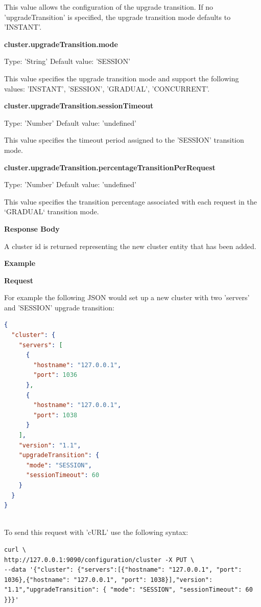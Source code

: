 \documentclass[a4paper,11pt,twoside]{report}
\begin{document}
\noindent
This value allows the configuration of the upgrade transition. If no 'upgradeTransition' is specified, the upgrade transition mode defaults to 'INSTANT'.\bigskip

\noindent
\textbf{cluster.upgradeTransition.mode}

\noindent
Type: 'String' Default value: 'SESSION'\smallskip

\noindent
This value specifies the upgrade transition mode and support the following values: 'INSTANT', 'SESSION', 'GRADUAL', 'CONCURRENT'.\bigskip

\noindent
\textbf{cluster.upgradeTransition.sessionTimeout}

\noindent
Type: 'Number' Default value: 'undefined'\smallskip

\noindent
This value specifies the timeout period assigned to the 'SESSION' transition mode. \bigskip

\noindent
\textbf{cluster.upgradeTransition.percentageTransitionPerRequest}

\noindent
Type: 'Number' Default value: 'undefined'\smallskip

\noindent
This value specifies the transition percentage associated with each request in the `GRADUAL` transition mode. \bigskip

\noindent
\textbf{Response Body}

\noindent
A cluster id is returned representing the new cluster entity that has been added. \bigskip

\noindent
\textbf{Example}\bigskip

\noindent
\textbf{Request}

\noindent
For example the following JSON would set up a new cluster with two 'servers' and 'SESSION' upgrade transition:\bigskip

\begin{lstlisting}[language=json]
{
  "cluster": {
    "servers": [
      {
        "hostname": "127.0.0.1", 
        "port": 1036
      },  
      {
        "hostname": "127.0.0.1", 
        "port": 1038
      }
    ], 
    "version": "1.1", 
    "upgradeTransition": {
      "mode": "SESSION", 
      "sessionTimeout": 60
    }
  }
}
\end{lstlisting}

\noindent \\
To send this request with 'cURL' use the following syntax:\bigskip

\begin{lstlisting}[language=terminal]
curl \
http://127.0.0.1:9090/configuration/cluster -X PUT \
--data '{"cluster": {"servers":[{"hostname": "127.0.0.1", "port": 1036},{"hostname": "127.0.0.1", "port": 1038}],"version": "1.1","upgradeTransition": { "mode": "SESSION", "sessionTimeout": 60 }}}'
\end{lstlisting}
\end{document}
